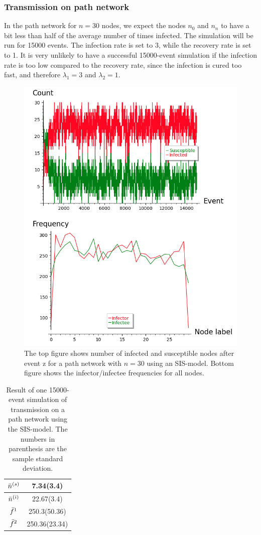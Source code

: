 \documentclass[12pt]{article} %
\numberwithin{equation}{section}
\begin{document}
\subsubsection{Transmission on path network}
In the path network for $n=30$ nodes, we expect the nodes $n_0$ and $n_n$ to have a bit less than half of the average number of times infected. 
The simulation will be run for 15000 events. The infection rate is set to 3, while the recovery rate is set to 1. It is very unlikely to have a successful 15000-event simulation if the infection rate is too low compared to the recovery rate, since the infection is cured too fast, and therefore $\lambda_1=3$ and $\lambda_2 = 1$. 
\begin{figure}[ht]
    \centering
    \includegraphics[scale=0.7]{SISpath1.png}   
    \caption{The top figure shows number of infected and susceptible nodes after event z for a path network with $n = 30$ using an SIS-model. Bottom figure shows the infector/infectee frequencies for all nodes.}
    \label{pathSISplot1}
\end{figure}
\begin{table}[H]
    \centering
\begin{tabular}{c|c}
     $\Bar{n}^{(s)}$ &7.34(3.4) \\ \hline 
     $\Bar{n}^{(i)}$ &22.67(3.4) \\ \hline
     $\Bar{f}^1$& 250.3(50.36)\\ \hline
     $\Bar{f}^2$&  250.36(23.34) 
\end{tabular}
    \caption{Result of one 15000-event simulation of transmission on a path network using the SIS-model. The numbers in parenthesis are the sample standard deviation.}
    \label{table:sispath}
\end{table}
\end{document}
